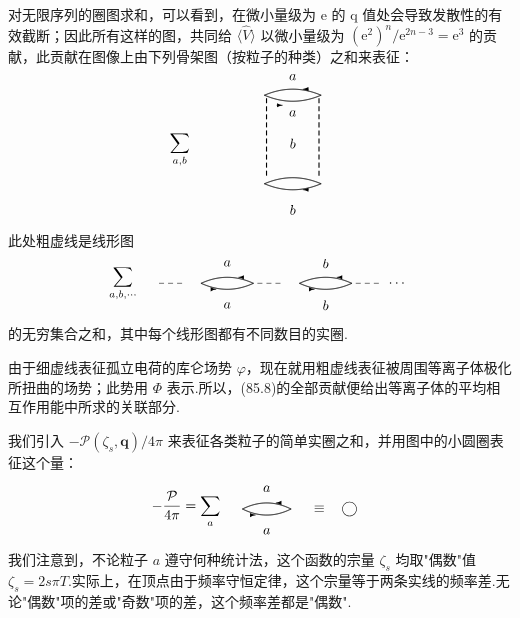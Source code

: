 对无限序列的圈图求和，可以看到，在微小量级为 e 的 q 值处会导致发散性的有效截断；因此所有这样的图，共同给 $\langle\hat{V}\rangle$ 以微小量级为 $(\mathrm{e}^{2})^{n}/\mathrm{e}^{2n-3}=\mathrm{e}^{3}$ 的贡献，此贡献在图像上由下列骨架图（按粒子的种类）之和来表征：
\begin{equation}
  \setlength{\unitlength}{0.72pt}%
  \begin{picture}(230,140)(0,0)
    \put(36,66){\makebox(0,0){$\displaystyle\sum_{a,b}$}}%
    \qbezier(120,120)(148,132)(176,120)%
    \qbezier(120,120)(148,108)(176,120)%
    \put(164,126){\vector(-1,0){6}}%
    \put(132,110){\vector(1,0){6}}%
    \put(148,138){\makebox(0,0){$a$}}%
    \put(148,102){\makebox(0,0){$a$}}%
    {\thicklines
    \vdashx{122}{112}{-8}{10}%
    \vdashx{174}{112}{-8}{10}}%
    \put(148,72){\makebox(0,0){$b$}}%
    \qbezier(120,32)(148,44)(176,32)%
    \qbezier(120,32)(148,20)(176,32)%
    \put(164,26){\vector(-1,0){6}}%
    \put(148,6){\makebox(0,0){$b$}}%
  \end{picture}
\end{equation}
此处粗虚线是线形图
\begin{equation}
  \setlength{\unitlength}{0.72pt}%
  \begin{picture}(340,50)(0,0)
    \put(34,26){\makebox(0,0){$\displaystyle\sum_{a,b,\cdots}$}}%
    \hdash{70}{26}{9}{3}%
    \qbezier(112,26)(138,38)(164,26)%
    \qbezier(112,26)(138,14)(164,26)%
    \put(154,32){\vector(-1,0){5}}%
    \put(122,20){\vector(1,0){5}}%
    \put(138,46){\makebox(0,0){$a$}}%
    \put(138,4){\makebox(0,0){$a$}}%
    \hdash{168}{26}{9}{3}%
    \qbezier(210,26)(236,38)(262,26)%
    \qbezier(210,26)(236,14)(262,26)%
    \put(252,32){\vector(-1,0){5}}%
    \put(220,20){\vector(1,0){5}}%
    \put(236,46){\makebox(0,0){$b$}}%
    \put(236,4){\makebox(0,0){$b$}}%
    \hdash{266}{26}{9}{3}%
    \put(308,26){\makebox(0,0){$\cdots$}}%
  \end{picture}
\end{equation}
的无穷集合之和，其中每个线形图都有不同数目的实圈.

由于细虚线表征孤立电荷的库仑场势 $\varphi$，现在就用粗虚线表征被周围等离子体极化所扭曲的场势；此势用 $\varPhi$ 表示.所以，(85.8)的全部贡献便给出等离子体的平均相互作用能中所求的关联部分.

我们引入 $-\mathcal{P}(\zeta_s,\bm{q})/4\pi$ 来表征各类粒子的简单实圈之和，并用图中的小圆圈表征这个量：
\begin{equation}
  \setlength{\unitlength}{0.72pt}%
  \begin{picture}(250,54)(0,0)
    \put(52,26){\makebox(0,0){$\displaystyle-\frac{\mathcal{P}}{4\pi}=\sum_{a}$}}%
    \qbezier(108,26)(132,38)(156,26)%
    \qbezier(108,26)(132,14)(156,26)%
    \put(146,32){\vector(-1,0){5}}%
    \put(116,20){\vector(1,0){5}}%
    \put(132,46){\makebox(0,0){$a$}}%
    \put(132,4){\makebox(0,0){$a$}}%
    \put(184,26){\makebox(0,0){$\equiv$}}%
    \put(214,26){\circle{14}}%
  \end{picture}
\end{equation}
我们注意到，不论粒子 $a$ 遵守何种统计法，这个函数的宗量 $\zeta_s$ 均取"偶数"值 $\zeta_s=2s\pi T$.实际上，在顶点由于频率守恒定律，这个宗量等于两条实线的频率差.无论"偶数"项的差或"奇数"项的差，这个频率差都是"偶数".

